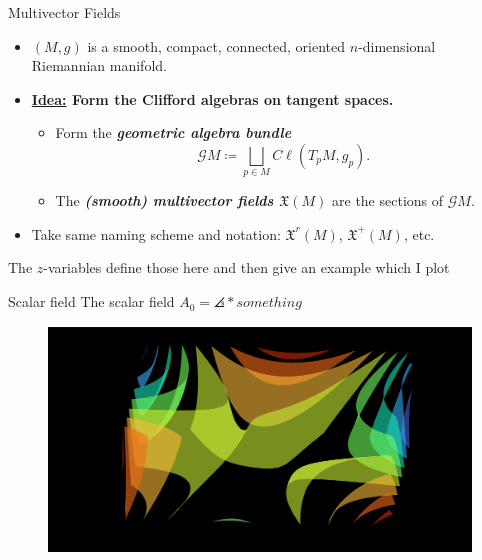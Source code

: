 \documentclass[aspectratio=169,handout]{beamer}
\newcommand\boldgreen[1]{\textcolor{lighter_csu_green}{\emph{\textbf{#1}}}}
\newcommand\boldgold[1]{\textcolor{csu_gold}{\textbf{#1}}}
\newcommand{\G}{\mathcal{G}}
\DeclarePairedDelimiter\angles{\langle}{\rangle}
\newcommand{\proj}[2]{\angles*{#2}_{#1}}
\newcommand{\smoothfields}{\mathfrak{X}}
\begin{document}
\begin{frame}{Multivector Fields}
\vfill
\begin{itemize}
\pause
\item $(M,g)$ is a smooth, compact, connected, oriented $n$-dimensional Riemannian manifold.
\pause
\item \noindent\boldgold{{\underline{Idea:}} Form the Clifford algebras on tangent spaces.}
    \begin{itemize}
        \pause
        \item Form the \boldgreen{geometric algebra bundle}
        \[
        \G M \coloneqq \bigsqcup_{p\in M} C\ell(T_pM,g_p).
        \]
        \pause
        \item The \boldgreen{(smooth) multivector fields $\smoothfields(M)$} are the sections of $\G M$.
    \end{itemize}
    \pause
    \item Take same naming scheme and notation: $\smoothfields^r(M)$, $\smoothfields^+(M)$, etc.
\end{itemize}
\vfill
\end{frame}

\begin{frame}{The $z$-variables}
define those here and then give an example which I plot
\end{frame}

\begin{frame}{Scalar field}
\vfill
The scalar field $A_0 = \proj{}{something}$
\begin{figure}[h]
         \centering
         \includegraphics[width=\textwidth]{figures/scalar_field}
\end{figure}
\vfill
\end{frame}
\end{document}

